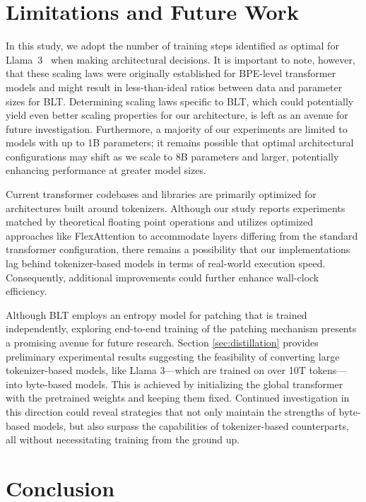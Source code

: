 \section{Limitations and Future Work}

In this study, we adopt the number of training steps identified as optimal for Llama~3~\citep{dubey2024llama} when making architectural decisions. It is important to note, however, that these scaling laws were originally established for BPE-level transformer models and might result in less-than-ideal ratios between data and parameter sizes for {\textsc BLT}. Determining scaling laws specific to {\textsc BLT}, which could potentially yield even better scaling properties for our architecture, is left as an avenue for future investigation. Furthermore, a majority of our experiments are limited to models with up to 1B parameters; it remains possible that optimal architectural configurations may shift as we scale to 8B parameters and larger, potentially enhancing performance at greater model sizes.

Current transformer codebases and libraries are primarily optimized for architectures built around tokenizers. Although our study reports experiments matched by theoretical floating point operations and utilizes optimized approaches like FlexAttention to accommodate layers differing from the standard transformer configuration, there remains a possibility that our implementations lag behind tokenizer-based models in terms of real-world execution speed. Consequently, additional improvements could further enhance wall-clock efficiency.

Although {\textsc BLT} employs an entropy model for patching that is trained independently, exploring end-to-end training of the patching mechanism presents a promising avenue for future research. Section \ref{sec:distillation} provides preliminary experimental results suggesting the feasibility of converting large tokenizer-based models, like Llama 3—which are trained on over 10T tokens—into byte-based models. This is achieved by initializing the global transformer with the pretrained weights and keeping them fixed. Continued investigation in this direction could reveal strategies that not only maintain the strengths of byte-based models, but also surpass the capabilities of tokenizer-based counterparts, all without necessitating training from the ground up.

\section{Conclusion}
\label{section:conclusion}

